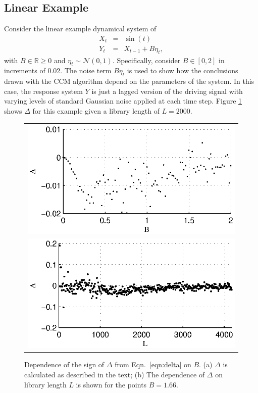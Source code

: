\documentclass[twocolumn,aps,pre,groupedaddress]{revtex4-1}
\begin{document}
\subsection{Linear Example}
Consider the linear example dynamical system of
\begin{eqnarray}
\label{eq:linearex}
X_t &=& \sin(t)\\
Y_t &=& X_{t-1}+B\eta_t,
\end{eqnarray}
with $B\in\mathbb{R}\ge 0$ and $\eta_t\sim\mathcal{N}\left(0,1\right)$.  Specifically, consider $B\in[0,2]$ in increments of 0.02.  The noise term $B\eta_t$ is used to show how the conclusions drawn with the CCM algorithm depend on the parameters of the system.  In this case, the response system $Y$ is just a lagged version of the driving signal with varying levels of standard Gaussian noise applied at each time step.  Figure \ref{fig:linearex1} shows $\Delta$ for this example given a library length of $L=2000$.
\begin{figure}[ht]
\begin{tabular}{l}
\includegraphics[scale=0.8]{LinearEx.eps} \\
\includegraphics[scale=0.8]{LinearExChangeL.eps} \\
\end{tabular}
\caption{Dependence of the sign of $\Delta$ from Eqn.\ \ref{eqn:delta} on $B$. (a) $\Delta$ is calculated as described in the text; (b) The dependence of $\Delta$ on library length $L$ is shown for the points $B = 1.66$.}
\label{fig:linearex1}
\end{figure}
\end{document}
